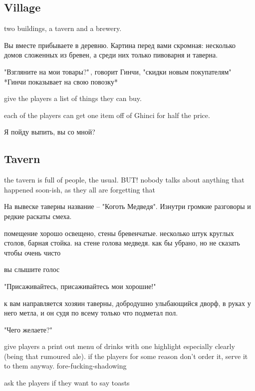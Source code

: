 \documentclass[a5paper,11pt]{book}
\begin{document}
\begin{multicols}{2}
\subsection{Village}
two buildings, a tavern and a brewery. 

\begin{boxed}
Вы вместе прибываете в деревню. Картина перед вами скромная: несколько домов сложенных из бревен, а среди них только пивоварня и таверна.

"Взгляните на мои товары?"\,, говорит Гинчи, "скидки новым покупателям" *Гинчи показывает на свою повозку*

\end{boxed}

give the players a list of things they can buy. 

each of the players can get one item off of Ghinci for half the price.

\begin{boxed}
Я пойду выпить, вы со мной?
\end{boxed}

\subsection{Tavern}
the tavern is full of people, the usual. BUT! nobody talks about anything that happened soon-ish, as they all are forgetting that

\begin{boxed}
На вывеске таверны название -- "Коготь Медведя". Изнутри громкие разговоры и редкие раскаты смеха.

помещение хорошо освещено, стены бревенчатые. несколько штук круглых столов, барная стойка. на стене голова медведя. как бы убрано, но не сказать чтобы очень чисто

вы слышите голос

"Присаживайтесь, присаживайтесь мои хорошие!"

к вам направляется хозяин таверны, добродушно улыбающийся дворф, в руках у него метла, и он судя по всему только что подметал пол.

"Чего желаете?"
\end{boxed}

give players a print out menu of drinks with one highlight especially clearly (being that rumoured ale). if the players for some reason don't order it, serve it to them anyway. fore-fucking-shadowing

ask the players if they want to say toasts


\end{multicols}
\end{document}

